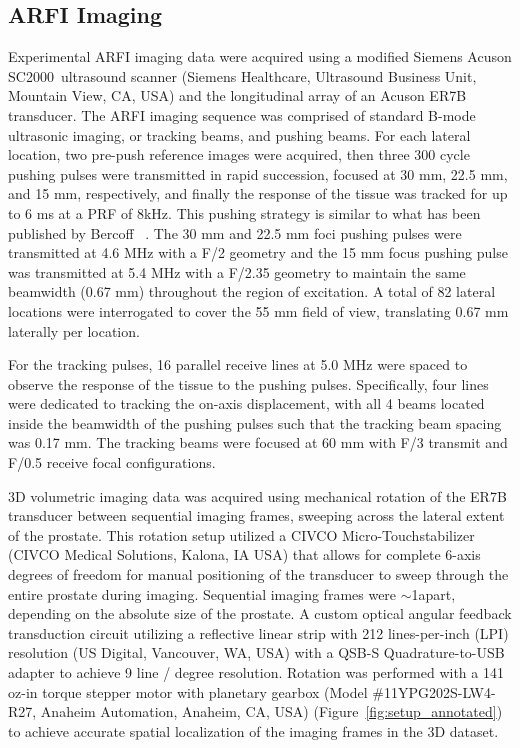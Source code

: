 \subsection{ARFI Imaging}
Experimental ARFI imaging data were acquired using a modified Siemens Acuson
SC2000\texttrademark~ultrasound scanner (Siemens Healthcare, Ultrasound Business Unit,
Mountain View, CA, USA) and the longitudinal array of an Acuson ER7B
transducer.  The ARFI imaging sequence was comprised of
standard B-mode ultrasonic imaging, or tracking beams, and pushing beams. For
each lateral location, two pre-push reference images were acquired, then three
300 cycle pushing pulses were transmitted in rapid succession, focused at 30
mm, 22.5 mm, and 15 mm, respectively, and finally the response of the tissue
was tracked for up to 6 ms at a PRF of 8kHz. This pushing strategy is similar to
what has been published by Bercoff \etal~\cite{Bercoff2004}. The 30 mm and 22.5
mm foci pushing pulses were transmitted at 4.6 MHz with a F/2 geometry and the
15 mm focus pushing pulse was transmitted at 5.4 MHz with a F/2.35 geometry to
maintain the same beamwidth (0.67 mm) throughout the region of excitation. A
total of 82 lateral locations were interrogated to cover the 55 mm field of
view, translating 0.67 mm laterally per location.

For the tracking pulses, 16 parallel receive lines at 5.0 MHz were spaced to
observe the response of the tissue to the pushing pulses.  Specifically, four
lines were dedicated to tracking the on-axis displacement, with all 4 beams
located inside the beamwidth of the pushing pulses such that the tracking beam
spacing was 0.17 mm.  The tracking beams were focused at 60 mm with F/3
transmit and F/0.5 receive focal configurations.

3D volumetric imaging data was acquired using mechanical rotation of the ER7B
transducer between sequential imaging frames, sweeping across the lateral
extent of the prostate.  This rotation setup utilized a CIVCO
Micro-Touch\texttrademark stabilizer (CIVCO Medical Solutions, Kalona, IA USA)
that allows for complete 6-axis degrees of freedom for manual positioning of
the transducer to sweep through the entire prostate during imaging.  Sequential
imaging frames were $\sim$1\degree apart, depending on the absolute size of the
prostate.  A custom optical angular feedback transduction circuit utilizing a
reflective linear strip with 212 lines-per-inch (LPI) resolution (US Digital,
Vancouver, WA, USA) with a QSB-S Quadrature-to-USB adapter to achieve 9 line /
degree resolution.  Rotation was performed with a 141 oz-in torque stepper
motor with planetary gearbox (Model \#11YPG202S-LW4-R27, Anaheim Automation,
Anaheim, CA, USA) (Figure~\ref{fig:setup_annotated}) to achieve accurate
spatial localization of the imaging frames in the 3D dataset.

